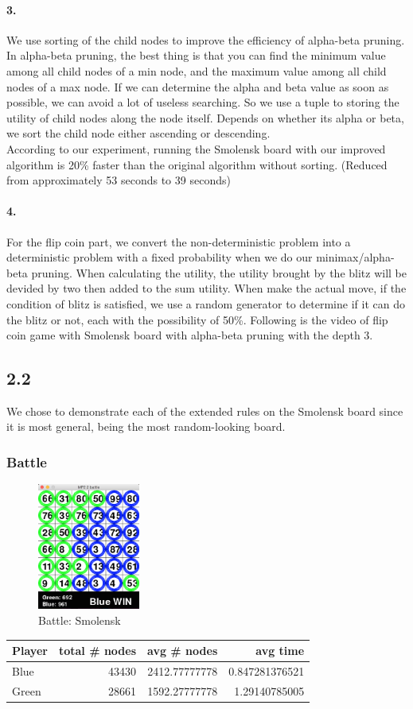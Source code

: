 \paragraph{3.}
We use sorting of the child nodes to improve the efficiency of alpha-beta pruning. In alpha-beta pruning, the best thing is that you can find the minimum value among all child nodes of a min node, and the maximum value among all child nodes of a max node. If we can determine the alpha and beta value as soon as possible, we can avoid a lot of useless searching. So we use a tuple to storing the utility of child nodes along the node itself. Depends on whether its alpha or beta, we sort the child node either ascending or descending.\\
According to our experiment, running the Smolensk board with our improved algorithm is 20\% faster than the original algorithm without sorting. (Reduced from approximately 53 seconds to 39 seconds) 
\paragraph{4.}
For the flip coin part, we convert the non-deterministic problem into a deterministic problem with a fixed probability when we do our minimax/alpha-beta pruning. When calculating the utility, the utility brought by the blitz will be devided by two then added to the sum utility. When make the actual move, if the condition of blitz is satisfied, we use a random generator to determine if it can do the blitz or not, each with the possibility of 50\%.
Following is the video of flip coin game with Smolensk board with alpha-beta pruning with the depth 3.
\subsection*{2.2}
We chose to demonstrate each of the extended rules on the Smolensk board since it is most general, being the most random-looking board.
\subsubsection*{Battle}
\begin{figure}[H]
\centering
\includegraphics[width=0.3\textwidth]{graphics/battle_smolensk2.png}
\caption{Battle: Smolensk}
\end{figure}
\begin{tabular}{l|r|r|r}
  Player & total \# nodes & avg \# nodes & avg time \\
  \hline
  Blue & 43430 & 2412.77777778 & 0.847281376521 \\
  Green & 28661 & 1592.27777778 & 1.29140785005 \\
\end{tabular}

